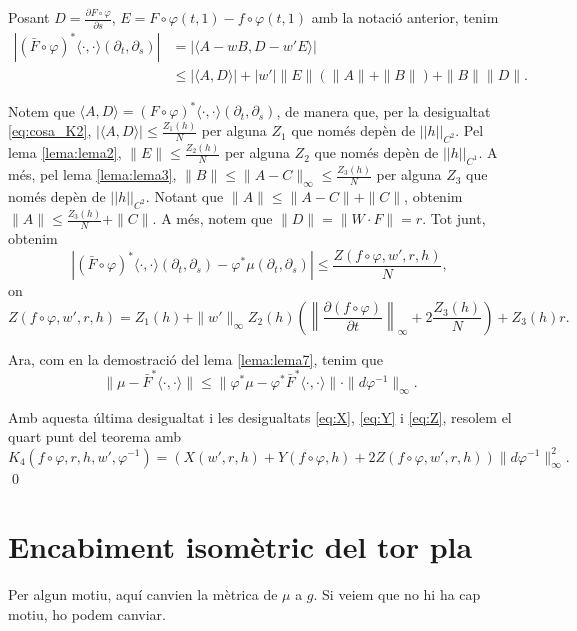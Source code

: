 {Posant $D=\frac{\partial F\circ\varphi}{\partial s}$, $E=F\circ\varphi(t,1) - f\circ\varphi(t,1)$ amb la notació anterior, tenim
\begin{align*}
    \left|(\bar F\circ\varphi)^*\langle\cdot,\cdot\rangle(\partial_t, \partial_s)\right| &= \left|\langle A-wB, D-w'E \rangle\right|\\
    &\le |\langle A, D\rangle| + |w'|\|E\|(\|A\| + \|B\|) + \|B\|\|D\|.
\end{align*}

Notem que $\langle A, D\rangle = (F\circ\varphi)^*\langle\cdot,\cdot\rangle(\partial_t,\partial_s)$, de manera que, per la desigualtat \ref{eq:cosa_K2}, $|\langle A, D\rangle|\le\frac{Z_1(h)}{N}$ per alguna $Z_1$ que només depèn de $||h||_{C^2}$. Pel lema \ref{lema:lema2}, $\|E\|\le\frac{Z_2(h)}{N}$ per alguna $Z_2$ que només depèn de $||h||_{C^1}$. A més, pel lema \ref{lema:lema3}, $\|B\|\le\|A-C\|_\infty\le\frac{Z_3(h)}{N}$ per alguna $Z_3$ que només depèn de $||h||_{C^2}$. Notant que $\|A\|\le\|A-C\|+\|C\|$, obtenim $\|A\|\le\frac{Z_3(h)}{N}+\|C\|$. A més, notem que $\|D\| = \|W\cdot F\| = r$. Tot junt, obtenim
\begin{equation}\label{eq:Z}
    \left|(\bar F\circ\varphi)^*\langle\cdot,\cdot\rangle(\partial_t, \partial_s)-\varphi^*\mu(\partial_t, \partial_s)\right|\le\frac{Z(f\circ\varphi,w',r,h)}{N},
\end{equation}
on 
\begin{equation*}
    Z(f\circ\varphi,w',r,h) = Z_1(h) + \|w'\|_\infty Z_2(h)\left( \left\|\frac{\partial(f\circ\varphi)}{\partial t}\right\|_\infty + 2\frac{Z_3(h)}{N} \right) + Z_3(h)r.
\end{equation*}

Ara, com en la demostració del lema \ref{lema:lema7}, tenim que 
\begin{equation*}
    \|\mu-\bar F^*\langle\cdot,\cdot\rangle\|\le\|\varphi^*\mu-\varphi^*\bar F^*\langle\cdot,\cdot\rangle\|\cdot\|d\varphi^{-1}\|_\infty.
\end{equation*}

Amb aquesta última desigualtat i les desigualtats \ref{eq:X}, \ref{eq:Y} i \ref{eq:Z}, resolem el quart punt del teorema amb 
\begin{equation*}
    K_4(f\circ\varphi,r,h,w',\varphi^{-1}) = (X(w',r,h) + Y(f\circ\varphi,h) + 2Z(f\circ\varphi,w',r,h))\|d\varphi^{-1}\|^2_\infty.
\end{equation*}
\qed
}

\section{Encabiment isomètric del tor pla}
{
\color{blue} Per algun motiu, aquí canvien la mètrica de $\mu$ a $g$. Si veiem que no hi ha cap motiu, ho podem canviar.
}

